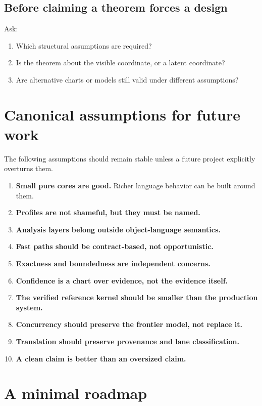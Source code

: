 \documentclass[11pt]{article}
\begin{document}
\subsection{Before claiming a theorem forces a design}

Ask:
\begin{enumerate}
    \item Which structural assumptions are required?
    \item Is the theorem about the visible coordinate, or a latent coordinate?
    \item Are alternative charts or models still valid under different assumptions?
\end{enumerate}

\section{Canonical assumptions for future work}

The following assumptions should remain stable unless a future project explicitly overturns them.

\begin{enumerate}
    \item \textbf{Small pure cores are good.} Richer language behavior can be built around them.
    \item \textbf{Profiles are not shameful, but they must be named.}
    \item \textbf{Analysis layers belong outside object-language semantics.}
    \item \textbf{Fast paths should be contract-based, not opportunistic.}
    \item \textbf{Exactness and boundedness are independent concerns.}
    \item \textbf{Confidence is a chart over evidence, not the evidence itself.}
    \item \textbf{The verified reference kernel should be smaller than the production system.}
    \item \textbf{Concurrency should preserve the frontier model, not replace it.}
    \item \textbf{Translation should preserve provenance and lane classification.}
    \item \textbf{A clean claim is better than an oversized claim.}
\end{enumerate}

\section{A minimal roadmap}
\end{document}
